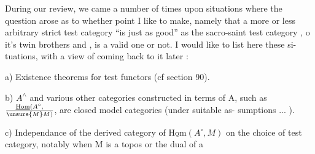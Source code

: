 During our review, we came a number of times upon situations where
the question arose as to whether   point I like to make, namely that
a more or less arbitrary \hand{(}strict\hand{)} test category\xout{,}  ``is just
as good'' as the sacro-saint test category \hand{$\Delta$}, o it's twin brothers
\hand{$\square$} and , is a valid one or not. I would like to list here these si-%
tuations, with a view of coming back to it later :

a) Existence theorems for test functors (cf section 90).

b) $A^{\wedge}$ and various other categories constructed in terms of A, such
as $\underline{\mathrm{Hom}}(A^{\circ},\over{\unsure{M}}{M} )$, are closed model categories (under suitable as-%
sumptions ... ).

c) Independance of the derived category of $\underline{\mathrm{Hom}}(A^{\circ},M)$ on the choice
of test category, notably when M is a topos or the dual of a


